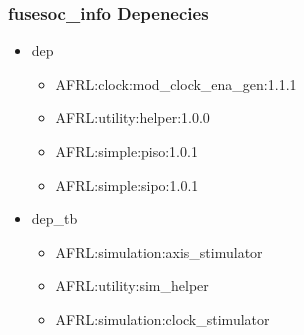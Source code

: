 \subsubsection{fusesoc\_info Depenecies}
\begin{itemize}
\item dep
	\begin{itemize}
	\item AFRL:clock:mod\_clock\_ena\_gen:1.1.1
	\item AFRL:utility:helper:1.0.0
	\item AFRL:simple:piso:1.0.1
	\item AFRL:simple:sipo:1.0.1
	\end{itemize}
\item dep\_tb
	\begin{itemize}
	\item AFRL:simulation:axis\_stimulator
	\item AFRL:utility:sim\_helper
	\item AFRL:simulation:clock\_stimulator
	\end{itemize}
\end{itemize}
